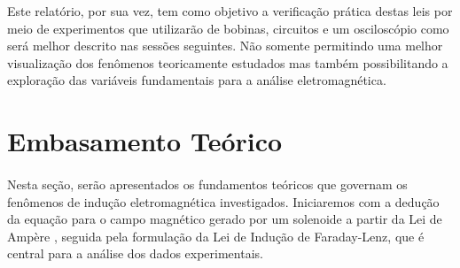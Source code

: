 \documentclass[column,brazilian,12pt,a4paper,final]{article}
\begin{document}
Este relatório, por sua vez, tem como objetivo a verificação prática destas leis por meio de experimentos que utilizarão de bobinas, circuitos e um osciloscópio como será melhor descrito nas sessões seguintes. Não somente permitindo uma melhor visualização dos fenômenos teoricamente estudados mas também possibilitando a exploração das variáveis fundamentais para a análise eletromagnética. 

\section{Embasamento Teórico}
\paragraph{}
Nesta seção, serão apresentados os fundamentos teóricos que governam os fenômenos de indução eletromagnética investigados. Iniciaremos com a dedução da equação para o campo magnético gerado por um solenoide a partir da Lei de Ampère , seguida pela formulação da Lei de Indução de Faraday-Lenz, que é central para a análise dos dados experimentais.
\end{document}
